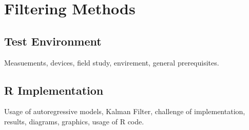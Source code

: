 \chapter{Filtering Methods}
\label{chap:filteringMethods}

\section{Test Environment}
Measuements, devices, field study, envirement, general prerequisites.

\section{R Implementation} 
Usage of autoregressive models, Kalman Filter, challenge of implementation, results, diagrams, graphics, usage of R code. 